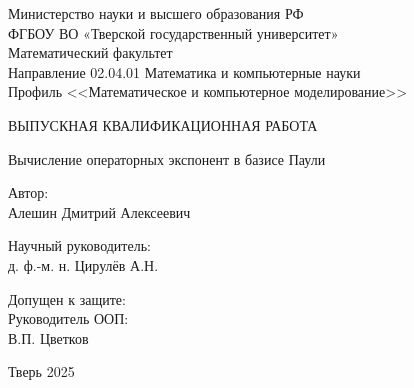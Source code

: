 \documentclass[a4paper]{report}
\begin{document}
\begin{titlepage}
    \begin{center}
        Министерство науки и высшего образования РФ\\
        ФГБОУ ВО «Тверской государственный университет»\\
        Математический факультет\\
        Направление 02.04.01 Математика и компьютерные науки\\
        Профиль <<Математическое и компьютерное моделирование>>
    \end{center}

    \vspace{2.5cm}
    \begin{center}

        {ВЫПУСКНАЯ КВАЛИФИКАЦИОННАЯ РАБОТА }


        \vspace{1.0cm}
        \large{Вычисление операторных экспонент в базисе Паули}


        \vspace{1.5cm}
    \end{center}



    \begin{flushright}
        \begin{minipage}{80mm}
            Автор:\\
            Алешин Дмитрий Алексеевич

            \vspace{1.0cm}
            Научный руководитель:\\
            д. ф.-м. н. Цирулёв А.Н.

        \end{minipage}
    \end{flushright}


    \vspace{1.6cm}
    \noindent Допущен к защите:\\
    Руководитель ООП:\\[1cm]
    \underline{\qquad \qquad \qquad \qquad \qquad }
    В.П. Цветков \\
    \vspace{2.3cm}



    \begin{center}
        Тверь 2025
    \end{center}

    \date{}
\end{titlepage}
\end{document}
